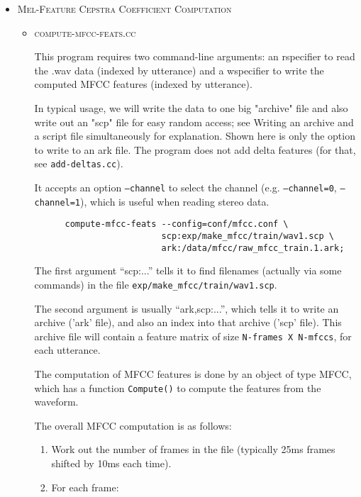 \documentclass[10pt,a4paper]{article}
\begin{document}
\begin{itemize}

\item \textsc{Mel-Feature Cepstra Coefficient Computation}
  \begin{itemize}
    \vspace{.25cm}
  \item \textsc{compute-mfcc-feats.cc}

    This program requires two command-line arguments: an rspecifier to read the .wav data (indexed by utterance) and a wspecifier to write the computed MFCC features (indexed by utterance).

    In typical usage, we will write the data to one big "archive" file and also write out an "scp" file for easy random access; see Writing an archive and a script file simultaneously for explanation. Shown here is only the option to write to an ark file. The program does not add delta features (for that, see \texttt{add-deltas.cc}). 

    It accepts an option \texttt{--channel} to select the channel (e.g. \texttt{--channel=0}, \texttt{--channel=1}), which is useful when reading stereo data.\\

    \begin{verbatim}
      compute-mfcc-feats --config=conf/mfcc.conf \
                         scp:exp/make_mfcc/train/wav1.scp \
                         ark:/data/mfcc/raw_mfcc_train.1.ark;
    \end{verbatim}

    The first argument “scp:...” tells it to find filenames (actually via some commands) in the file \texttt{exp/make\_mfcc/train/wav1.scp}.
    
    The second argument is usually “ark,scp:...”, which tells it to write an archive ('ark' file), and also an index into that archive ('scp' file). This archive file will contain a feature matrix of size \texttt{N-frames X N-mfccs}, for each utterance.
    
    The computation of MFCC features is done by an object of type MFCC, which has a function \texttt{Compute()} to compute the features from the waveform.
    
    The overall MFCC computation is as follows:\\
    
    \begin{enumerate}
    \item Work out the number of frames in the file (typically 25ms frames shifted by 10ms each time).
    \item For each frame:


\end{enumerate}
\end{itemize}
\end{itemize}
\end{document}
